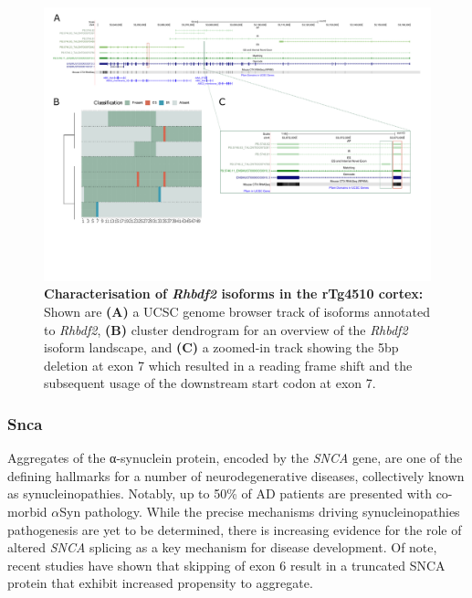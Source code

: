 \begin{landscape}
	\begin{figure}[htp]
		\centering
		\includegraphics[page=9,trim={0 5cm 0 0},scale = 0.85]{Figures/TargetGenes_Annotation_Landscape.pdf}
		\captionsetup{width=1.3\textwidth}
		\caption[Characterisation of \textit{Rhbdf2} isoforms in the rTg4510 cortex]%
		{\textbf{Characterisation of \textit{Rhbdf2} isoforms in the rTg4510 cortex:} Shown are \textbf{(A)} a UCSC genome browser track of isoforms annotated to \textit{Rhbdf2}, \textbf{(B)} cluster dendrogram for an overview of the \textit{Rhbdf2} isoform landscape, and \textbf{(C)} a zoomed-in track showing the 5bp deletion at exon 7 which resulted in a reading frame shift and the subsequent usage of the downstream start codon at exon 7.}   
		\label{fig:rhbdf2}
	\end{figure}
\end{landscape}
\restoregeometry

\newpage
\subsubsection{Snca}
Aggregates of the α-synuclein protein, encoded by the \textit{SNCA} gene, are one of the defining hallmarks for a number of neurodegenerative diseases, collectively known as synucleinopathies. Notably, up to 50\% of AD patients are presented with co-morbid $\alpha$Syn pathology. While the precise mechanisms driving synucleinopathies pathogenesis are yet to be determined, there is increasing evidence for the role of altered \textit{SNCA} splicing as a key mechanism for disease development\cite{Beyer2012, Beyer2006}. Of note, recent studies have shown that skipping of exon 6 result in a truncated SNCA protein that exhibit increased propensity to aggregate\cite{Beyer2012, Beyer2006}. 

